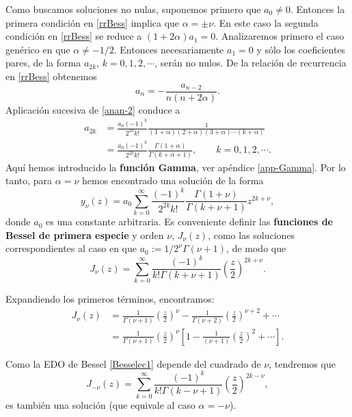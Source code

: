 Como buscamos soluciones no nulas, suponemos primero que $a_0\neq 0$. Entonces la primera condición en \eqref{rrBess} implica que $\alpha=\pm\nu$. En este caso la segunda condición en \eqref{rrBess} se reduce a $(1+2\alpha)a_1=0$. Analizaremos primero el caso genérico en que $\alpha\neq -1/2$. Entonces necesariamente $a_1=0$ y sólo los coeficientes pares, de la forma $a_{2k}$, $k=0,1,2,\cdots$, serán no nulos. De la relación de recurrencia en \eqref{rrBess} obtenemos
\begin{equation}\label{anan-2}
a_n=-\frac{a_{n-2}}{n(n+2\alpha)}.
\end{equation}
Aplicación sucesiva de \eqref{anan-2} conduce a
\begin{align}
a_{2 k} &= \frac{a_0(-1)^k}{2^{2k}k!}\frac{1}{(1+\alpha)(2+\alpha)(3+\alpha)\cdots (k+\alpha)}\\
&= \frac{a_0 (-1)^k}{2^{2k} k!}\frac{\Gamma(1+\alpha)}{\Gamma(k +\alpha+ 1) }, \qquad k=0,1,2,\cdots. 
\end{align}
Aquí hemos introducido la \textbf{función Gamma}, ver apéndice \ref{app-Gamma}. Por lo tanto, para $\alpha=\nu$ hemos encontrado una solución de la forma
\begin{equation}
y_\nu(z) = a_0 \sum_{k=0}^\infty \frac{(-1)^k}{2^{2k}k!}\frac{\Gamma(1+\nu)}{\Gamma(k+\nu+ 1) }
z^{2k+\nu},
\end{equation}
donde $a_0$ es una constante arbitraria. Es conveniente definir las \textbf{funciones de Bessel de primera especie} y orden $\nu$, $J_\nu(z)$, como las soluciones correspondientes al caso en que $a_0:=1/2^{\nu}\Gamma(\nu+1)$, de modo que
\begin{equation}\label{Besselnu}
\boxed{J_\nu(z) = \sum_{k = 0}^\infty \frac{ (-1)^k }{ k! \Gamma(k + \nu + 1) }
\left( \frac{z}{2} \right)^{2k+\nu}.}
\end{equation}

Expandiendo los primeros términos, encontramos:
\begin{align}\label{J-nu}
J_\nu(z) &= \frac{1}{\Gamma(\nu+1)}\left(\frac{z}{2}\right)^{\nu}
-\frac{1}{\Gamma(\nu+2)}\left(\frac{z}{2}\right)^{\nu+2}+ \cdots \\
&= \frac{1}{\Gamma(\nu+1)}\left(\frac{z}{2}\right)^{\nu}\left[1-\frac{1}{(\nu+1)}\left(\frac{z}{2}\right)^2+\cdots \right].
\end{align}

Como la EDO de Bessel \eqref{Besselec1} depende del cuadrado de $\nu$, tendremos que 
\begin{equation}
J_{-\nu}(z) = \sum_{k = 0}^\infty \frac{ (-1)^k }{ k! \Gamma(k-\nu+1) }
\left( \frac{z}{2} \right)^{2k-\nu},
\end{equation}
es también una solución (que equivale al caso $\alpha=-\nu$). 

